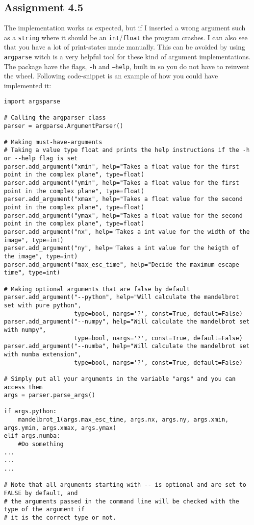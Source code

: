 \documentclass[a4paper]{article}
\begin{document}
\subsection*{Assignment 4.5}
The implementation works as expected, but if I inserted a wrong argument such as a \texttt{string} where it should be an \texttt{int}/\texttt{float} the program crashes. I can also see that you have a lot of print-states made manually. This can be avoided by using \texttt{argparse} witch is a very helpful tool for these kind of argument implementations. The package have the flags, \texttt{-h} and \texttt{--help}, built in so you do not have to reinvent the wheel. Following code-snippet is an example of how you could have implemented it:
\begin{verbatim}
import argsparse

# Calling the argparser class
parser = argparse.ArgumentParser()

# Making must-have-arguments
# Taking a value type float and prints the help instructions if the -h or --help flag is set
parser.add_argument("xmin", help="Takes a float value for the first point in the complex plane", type=float)
parser.add_argument("ymin", help="Takes a float value for the first point in the complex plane", type=float)
parser.add_argument("xmax", help="Takes a float value for the second point in the complex plane", type=float)
parser.add_argument("ymax", help="Takes a float value for the second point in the complex plane", type=float)
parser.add_argument("nx", help="Takes a int value for the width of the image", type=int)
parser.add_argument("ny", help="Takes a int value for the heigth of the image", type=int)
parser.add_argument("max_esc_time", help="Decide the maximum escape time", type=int)

# Making optional arguments that are false by default
parser.add_argument("--python", help="Will calculate the mandelbrot set with pure python",
                    type=bool, nargs='?', const=True, default=False)
parser.add_argument("--numpy", help="Will calculate the mandelbrot set with numpy",
                    type=bool, nargs='?', const=True, default=False)
parser.add_argument("--numba", help="Will calculate the mandelbrot set with numba extension",
                    type=bool, nargs='?', const=True, default=False)
                    
# Simply put all your arguments in the variable "args" and you can access them 
args = parser.parse_args()

if args.python:
    mandelbrot_1(args.max_esc_time, args.nx, args.ny, args.xmin, args.ymin, args.xmax, args.ymax)
elif args.numba:
    #Do something
...
...
...

# Note that all arguments starting with -- is optional and are set to FALSE by default, and
# the arguments passed in the command line will be checked with the type of the argument if
# it is the correct type or not.
\end{verbatim}
\end{document}
